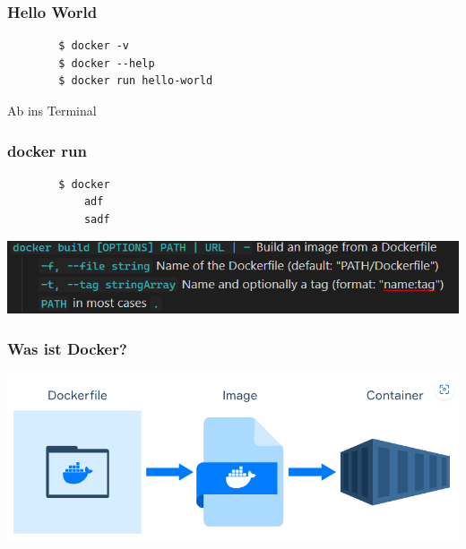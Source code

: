 \documentclass[22pt,handout]{beamer}
\begin{document}
\begin{frame}[fragile]
    \frametitle{Hello World} %
    \begin{verbatim}
        $ docker -v
        $ docker --help
        $ docker run hello-world
    \end{verbatim}

    Ab ins Terminal
\end{frame}

\begin{frame}[fragile]
    \frametitle{docker run} 
    \begin{verbatim}
        $ docker 
            adf
            sadf
    \end{verbatim}

    \includegraphics{Bilder/Docker build.png}
\end{frame}

\begin{frame}[c]
    \frametitle{Was ist Docker?}
    \includegraphics[width=1\textwidth]{Bilder/Docker-Ablauf.png}
\end{frame}

\end{document}
